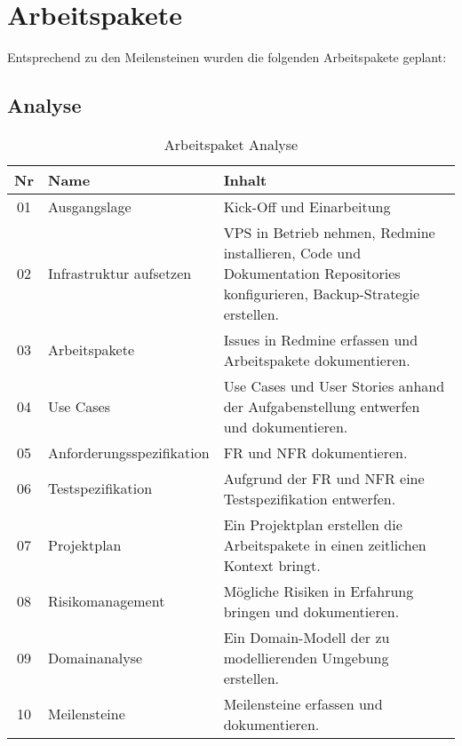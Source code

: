 \section{Arbeitspakete}
\label{sec:Arbeitspakete}

Entsprechend zu den Meilensteinen wurden die folgenden Arbeitspakete geplant:

\subsection{Analyse}
\begin{table}[H]
\begin{tabularx}{\textwidth}{ c | l | X }

\textbf{Nr} & \textbf{Name} & \textbf{Inhalt} \\ \hline
01 & Ausgangslage & Kick-Off und Einarbeitung \\ \hline
02 & Infrastruktur aufsetzen & VPS in Betrieb nehmen, Redmine installieren, Code und Dokumentation Repositories konfigurieren, Backup-Strategie erstellen. \\ \hline
03 & Arbeitspakete & Issues in Redmine erfassen und Arbeitspakete dokumentieren. \\ \hline
04 & Use Cases & Use Cases und User Stories anhand der Aufgabenstellung entwerfen und dokumentieren.\\ \hline
05 & Anforderungsspezifikation & \ac{FR} und \ac{NFR} dokumentieren.\\ \hline
06 & Testspezifikation & Aufgrund der \ac{FR} und \ac{NFR} eine Testspezifikation entwerfen.\\ \hline
07 & Projektplan & Ein Projektplan erstellen die Arbeitspakete in einen zeitlichen Kontext bringt.\\ \hline
08 & Risikomanagement & Mögliche Risiken in Erfahrung bringen und dokumentieren.\\ \hline
09 & Domainanalyse & Ein Domain-Modell der zu modellierenden Umgebung erstellen.\\ \hline
10 & Meilensteine & Meilensteine erfassen und dokumentieren.\\
\end{tabularx}
\caption{Arbeitspaket Analyse}
\end{table}